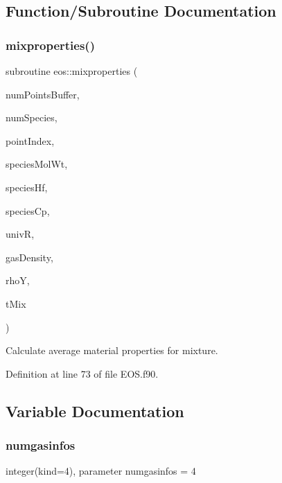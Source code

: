 \subsection{Function/\+Subroutine Documentation}
\hypertarget{namespaceeos_aca70c80cb10c8ae79d29cecf6474e85a}{}\label{namespaceeos_aca70c80cb10c8ae79d29cecf6474e85a} 
\subsubsection{\texorpdfstring{mixproperties()}{mixproperties()}}
{\footnotesize\ttfamily subroutine eos\+::mixproperties (\begin{DoxyParamCaption}\item[{integer(kind=8)}]{num\+Points\+Buffer,  }\item[{integer(kind=4)}]{num\+Species,  }\item[{integer(kind=8)}]{point\+Index,  }\item[{real(kind=8), dimension(numspecies)}]{species\+Mol\+Wt,  }\item[{real(kind=8), dimension(numspecies)}]{species\+Hf,  }\item[{real(kind=8), dimension(numspecies)}]{species\+Cp,  }\item[{real(kind=8)}]{univR,  }\item[{real(kind=8), dimension(numpointsbuffer)}]{gas\+Density,  }\item[{real(kind=8), dimension(numspecies$\ast$numpointsbuffer)}]{rhoY,  }\item[{real(kind=8), dimension(3)}]{t\+Mix }\end{DoxyParamCaption})}



Calculate average material properties for mixture. 



Definition at line 73 of file E\+O\+S.\+f90.



\subsection{Variable Documentation}
\hypertarget{namespaceeos_ae3be5cc8a1583f01f17df576ad87bc32}{}\label{namespaceeos_ae3be5cc8a1583f01f17df576ad87bc32} 
\subsubsection{\texorpdfstring{numgasinfos}{numgasinfos}}
{\footnotesize\ttfamily integer(kind=4), parameter numgasinfos = 4}



